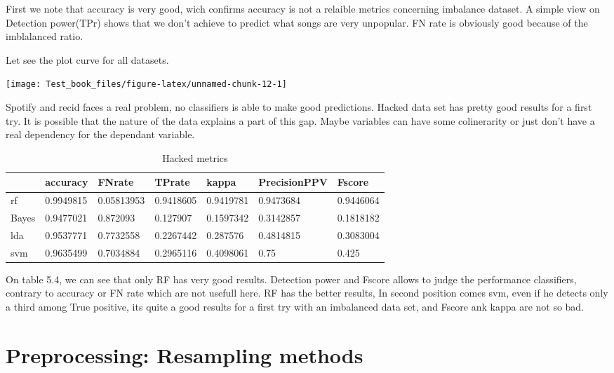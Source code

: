 \documentclass[
]{report}
\begin{document}
First we note that accuracy is very good, wich confirms accuracy is not a relaible metrics concerning imbalance dataset. A simple view on Detection power(TPr) shows that we don't achieve to predict what songs are very unpopular. FN rate is obviously good because of the imblalanced ratio.

Let see the plot curve for all datasets.

\begin{center}\texttt{[image: Test\_book\_files/figure-latex/unnamed-chunk-12-1]} \end{center}

Spotify and recid faces a real problem, no classifiers is able to make good predictions. Hacked data set has pretty good results for a first try.
It is possible that the nature of the data explains a part of this gap. Maybe variables can have some colinerarity or just don't have a real dependency for the dependant variable.

\begin{table}

\caption{\label{tab:unnamed-chunk-13}Hacked metrics}
\centering
\begin{tabular}[t]{l|l|l|l|l|l|l}
\hline
  & accuracy & FNrate & TPrate & kappa & PrecisionPPV & Fscore\\
\hline
rf & 0.9949815 & 0.05813953 & 0.9418605 & 0.9419781 & 0.9473684 & 0.9446064\\
\hline
Bayes & 0.9477021 & 0.872093 & 0.127907 & 0.1597342 & 0.3142857 & 0.1818182\\
\hline
lda & 0.9537771 & 0.7732558 & 0.2267442 & 0.287576 & 0.4814815 & 0.3083004\\
\hline
svm & 0.9635499 & 0.7034884 & 0.2965116 & 0.4098061 & 0.75 & 0.425\\
\hline
\end{tabular}
\end{table}

On table 5.4, we can see that only RF has very good results. Detection power and Fscore allows to judge the performance classifiers, contrary to accuracy or FN rate which are not usefull here. RF has the better results, In second position comes svm, even if he detects only a third among True positive, its quite a good results for a first try with an imbalanced data set, and Fscore ank kappa are not so bad.

\hypertarget{preprocessing-resampling-methods}{%
\section{Preprocessing: Resampling methods}\label{preprocessing-resampling-methods}}
\end{document}
